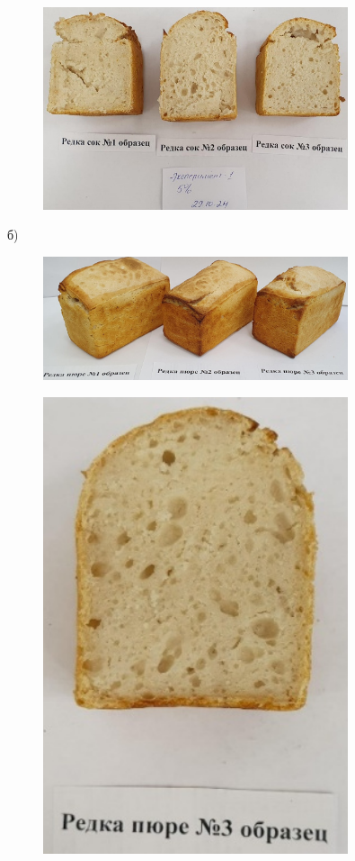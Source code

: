 \begin{figure}[H]
	\centering
	\includegraphics[width=0.8\textwidth]{media/pish/image64}
	\caption*{}
\end{figure}
б) 
\begin{figure}[H]
	\centering
	\includegraphics[width=0.8\textwidth]{media/pish/image65}
	\caption*{}
\end{figure}
\begin{figure}[H]
	\centering
	\includegraphics[width=0.8\textwidth]{media/pish/image66}
	\caption*{}
\end{figure}
